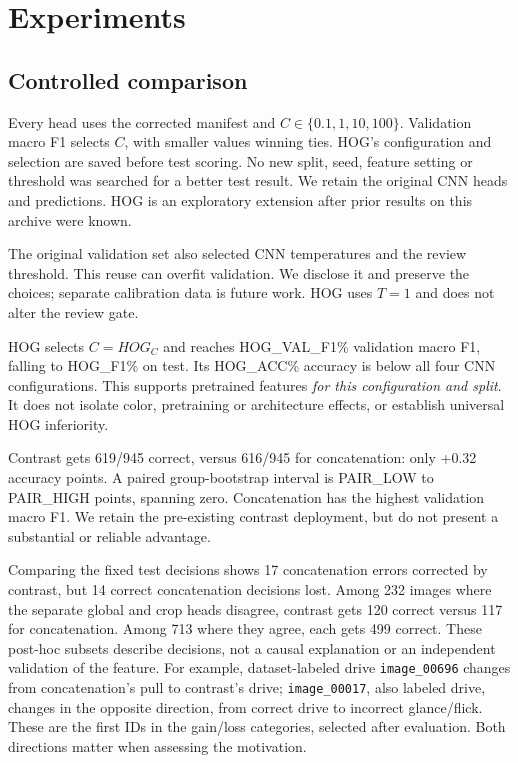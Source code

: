 \section{Experiments}
\subsection{Controlled comparison}
Every head uses the corrected manifest and $C\in\{0.1,1,10,100\}$. Validation macro F1 selects $C$, with smaller values winning ties. HOG's configuration and selection are saved before test scoring. No new split, seed, feature setting or threshold was searched for a better test result. We retain the original CNN heads and predictions. HOG is an exploratory extension after prior results on this archive were known.

The original validation set also selected CNN temperatures and the review threshold. This reuse can overfit validation. We disclose it and preserve the choices; separate calibration data is future work. HOG uses $T=1$ and does not alter the review gate.


HOG selects $C={{HOG_C}}$ and reaches {{HOG_VAL_F1}}\% validation macro F1, falling to {{HOG_F1}}\% on test. Its {{HOG_ACC}}\% accuracy is below all four CNN configurations. This supports pretrained features \emph{for this configuration and split}. It does not isolate color, pretraining or architecture effects, or establish universal HOG inferiority.

Contrast gets 619/945 correct, versus 616/945 for concatenation: only +0.32 accuracy points. A paired group-bootstrap interval is {{PAIR_LOW}} to {{PAIR_HIGH}} points, spanning zero. Concatenation has the highest validation macro F1. We retain the pre-existing contrast deployment, but do not present a substantial or reliable advantage.


Comparing the fixed test decisions shows 17 concatenation errors corrected by contrast, but 14 correct concatenation decisions lost. Among 232 images where the separate global and crop heads disagree, contrast gets 120 correct versus 117 for concatenation. Among 713 where they agree, each gets 499 correct. These post-hoc subsets describe decisions, not a causal explanation or an independent validation of the feature. For example, dataset-labeled drive \texttt{image\_00696} changes from concatenation's pull to contrast's drive; \texttt{image\_00017}, also labeled drive, changes in the opposite direction, from correct drive to incorrect glance/flick. These are the first IDs in the gain/loss categories, selected after evaluation. Both directions matter when assessing the motivation.

